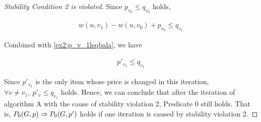 \documentclass[11pt,a4paper]{article}
\begin{document}
\begin{proof}[Stability Condition 2 is violated]
    Since $p_{v_0} \leq q_{v_0}$ holds,

    \begin{align}
        w(u, v_1) - w(u, v_0) + p_{v_0} \leq q_{v_1}
    \end{align}

    Combined with \eqref{ex2:p_v_1leqbala}, we have

    \begin{align}
        p'_{v_1} \leq q_{v_1}
    \end{align}

    Since $p'_{v_1}$ is the only item whose price is changed in this
    iteration, $\forall v \neq v_1,\ p'_{v} \leq q_{v_1}$ holds. Hence, we can
    conclude that after the iteration of algorithm A with the cause of
    stability violation 2, Predicate 0 still holds.
    That is, $ P_0(G, p) \Rightarrow P_0(G, p') $ holds if one iteration is
    caused by stability violation 2.

\end{proof}
\end{document}
